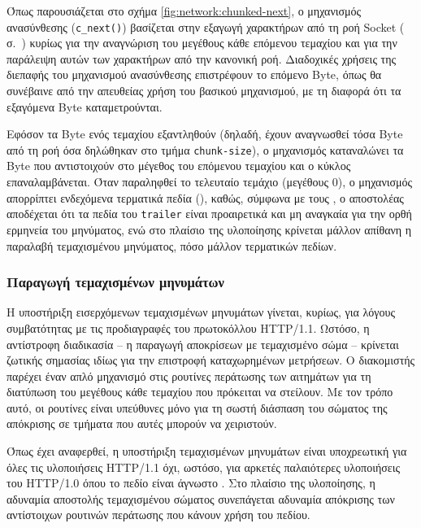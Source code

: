 Όπως παρουσιάζεται στο σχήμα
\ref{fig:network:chunked-next}, ο μηχανισμός ανασύνθεσης (\verb~c_next()~)
βασίζεται στην εξαγωγή χαρακτήρων από τη ροή Socket
( σ.~\pageref{ssubsec:network:sbuffer}) κυρίως
για την αναγνώριση του μεγέθους κάθε επόμενου τεμαχίου και για την παράλειψη
αυτών των χαρακτήρων από την κανονική ροή. Διαδοχικές χρήσεις της διεπαφής του
μηχανισμού ανασύνθεσης επιστρέφουν το επόμενο Byte, όπως θα συνέβαινε από την
απευθείας χρήση του βασικού μηχανισμού, με τη διαφορά ότι τα εξαγόμενα Byte
καταμετρούνται.

Εφόσον τα Byte ενός τεμαχίου εξαντληθούν (δηλαδή, έχουν αναγνωσθεί τόσα Byte από
τη ροή όσα δηλώθηκαν στο τμήμα \verb~chunk-size~), ο μηχανισμός καταναλώνει τα
Byte που αντιστοιχούν στο μέγεθος του επόμενου τεμαχίου και ο κύκλος
επαναλαμβάνεται. Όταν παραληφθεί το τελευταίο τεμάχιο (μεγέθους 0), ο μηχανισμός
απορρίπτει ενδεχόμενα τερματικά πεδία (), καθώς, σύμφωνα με τους
\textcite[26]{rfc2616}, ο αποστολέας αποδέχεται ότι τα πεδία του \verb~trailer~
είναι προαιρετικά και μη αναγκαία για την ορθή ερμηνεία του μηνύματος, ενώ στο
πλαίσιο της υλοποίησης κρίνεται μάλλον απίθανη η παραλαβή τεμαχισμένου
μηνύματος, πόσο μάλλον τερματικών πεδίων.


\subsubsection{Παραγωγή τεμαχισμένων μηνυμάτων}
\label{ssubsec:network:chunked-output}

Η υποστήριξη εισερχόμενων τεμαχισμένων μηνυμάτων γίνεται, κυρίως, για λόγους
συμβατότητας με τις προδιαγραφές του πρωτοκόλλου HTTP/1.1. Ωστόσο, η αντίστροφη
διαδικασία -- η παραγωγή αποκρίσεων με τεμαχισμένο σώμα -- κρίνεται ζωτικής
σημασίας ιδίως για την επιστροφή καταχωρημένων μετρήσεων.
Ο διακομιστής παρέχει έναν απλό μηχανισμό στις ρουτίνες περάτωσης των αιτημάτων
για τη διατύπωση του μεγέθους κάθε τεμαχίου που πρόκειται να στείλουν. Με τον
τρόπο αυτό, οι ρουτίνες είναι υπεύθυνες μόνο για τη σωστή διάσπαση του σώματος
της απόκρισης σε τμήματα που αυτές μπορούν να χειριστούν.

Όπως έχει αναφερθεί, η υποστήριξη τεμαχισμένων μηνυμάτων είναι υποχρεωτική για
όλες τις υλοποιήσεις HTTP/1.1 όχι, ωστόσο, για αρκετές παλαιότερες υλοποιήσεις
του HTTP/1.0 όπου το πεδίο  είναι άγνωστο
\parencite[25--26,144]{rfc2616}. Στο πλαίσιο της υλοποίησης, η αδυναμία
αποστολής τεμαχισμένου σώματος συνεπάγεται αδυναμία απόκρισης των αντίστοιχων
ρουτινών περάτωσης που κάνουν χρήση του πεδίου.

